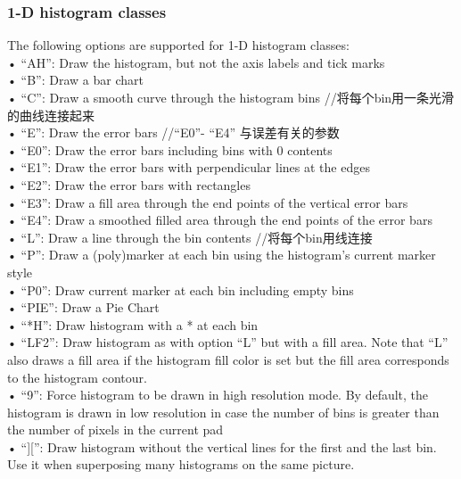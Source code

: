 \documentclass[11pt,a4paper,titlepage]{article}
\begin{document}
{\subsubsection{1-D histogram classes}
The following options are supported for 1-D histogram classes:\\
• “AH”: Draw the histogram, but not the axis labels and tick marks\\
• “B”: Draw a bar chart\\
• “C”: Draw a smooth curve through the histogram bins  //将每个bin用一条光滑的曲线连接起来\\
• “E”: Draw the error bars    //“E0”- “E4” 与误差有关的参数\\
• “E0”: Draw the error bars including bins with 0 contents\\
• “E1”: Draw the error bars with perpendicular lines at the edges\\
• “E2”: Draw the error bars with rectangles\\
• “E3”: Draw a fill area through the end points of the vertical error bars\\
• “E4”: Draw a smoothed filled area through the end points of the error bars\\
• “L”: Draw a line through the bin contents  //将每个bin用线连接\\
• “P”: Draw a (poly)marker at each bin using the histogram’s current marker style\\
• “P0”: Draw current marker at each bin including empty bins\\
• “PIE”: Draw a Pie Chart\\
• “*H”: Draw histogram with a * at each bin\\
• “LF2”: Draw histogram as with option “L” but with a fill area. Note that “L” also draws a fill area if the histogram fill color is set but the fill area corresponds to the histogram contour.\\
• “9”: Force histogram to be drawn in high resolution mode. By default, the histogram is drawn in low resolution in case the number of bins is greater than the number of pixels in the current pad\\
• “][”: Draw histogram without the vertical lines for the first and the last bin. Use it when superposing many histograms on the same picture.\\

}
\end{document}
